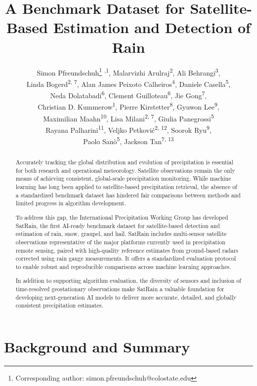 \documentclass[11pt]{article}
\title{A Benchmark Dataset for Satellite-Based Estimation and Detection of Rain}
\author{%
	  Simon Pfreundschuh\thanks{Corresponding author: simon.pfreundschuh@colostate.edu} \textsuperscript{,1}, %
	Malarvizhi Arulraj\textsuperscript{2}, %
	Ali Behrangi\textsuperscript{3},\\ %
	Linda Bogerd\textsuperscript{2, 7},%
	Alan James Peixoto Calheiros\textsuperscript{4}, %
	Daniele Casella\textsuperscript{5},\\ %
	Neda Dolatabadi\textsuperscript{6}, %
	Clement Guilloteau\textsuperscript{6}, %
	Jie Gong\textsuperscript{7},\\ %
	Christian D. Kummerow\textsuperscript{1}, %
	Pierre Kirstetter\textsuperscript{8},  %
	Gyuwon Lee\textsuperscript{9},\\ %
	Maximilian Maahn\textsuperscript{10}, %
	Lisa Milani\textsuperscript{2, 7}, %
  Giulia Panegrossi\textsuperscript{5} \\ %
	Rayana Palharini\textsuperscript{11},%
	Veljko Petković\textsuperscript{2, 12}, %
	Soorok Ryu\textsuperscript{9},\\ %
	Paolo Sanò\textsuperscript{5}, %
	Jackson Tan\textsuperscript{7, 13}
}
\date{
  \begin{flushleft}
	\footnotesize
	\textsuperscript{1} Department of Atmospheric Science, Colorado State University \\
	\textsuperscript{2} Earth System Science Interdisciplinary Center, University of Maryland  \\
	\textsuperscript{3} Department of Hydrology and Atmospheric Sciences, University of Arizona\\
	\textsuperscript{4} Instituto Nacional de Pesquisas Espaciais \\
	\textsuperscript{5} Institute of Atmospheric Sciences and Climate, Italian National Research Council \\
	\textsuperscript{6} Department of Civil and Environmental Engineering, University of California Irvine \\
	\textsuperscript{7} NASA Goddard Space Flight Center \\
  \textsuperscript{8} School of Meteorology \& School of Civil Engineering and Environmental Science, University of Oklahoma \\
	\textsuperscript{9} Department of Atmospheric Sciences, Kyungpook National University \\
	\textsuperscript{10} Institute for Meteorology, Leipzig University \\
  \textsuperscript{11} Departamento de Prevención de Riegos y Medio Ambiente, Universidad Tecnológica Metropolitana, \\
	\textsuperscript{12} Cooperative Institute for Satellite Earth System Studies, University of Maryland  \\
  \textsuperscript{13} University of Maryland, Baltimore County \\
	\end{flushleft}
}
\begin{document}
\maketitle


\begin{abstract}

	Accurately tracking the global distribution and evolution of precipitation is essential for both research and operational meteorology. Satellite observations remain the only means of achieving consistent, global-scale precipitation monitoring. While machine learning has long been applied to satellite-based precipitation retrieval, the absence of a standardized benchmark dataset has hindered fair comparisons between methods and limited progress in algorithm development.

	To address this gap, the International Precipitation Working Group has developed SatRain, the first AI-ready benchmark dataset for satellite-based detection and estimation of rain, snow, graupel, and hail. SatRain includes multi-sensor satellite observations representative of the major platforms currently used in precipitation remote sensing, paired with high-quality reference estimates from ground-based radars corrected using rain gauge measurements. It offers a standardized evaluation protocol to enable robust and reproducible comparisons across machine learning approaches.

	In addition to supporting algorithm evaluation, the diversity of sensors and inclusion of time-resolved geostationary observations make SatRain a valuable foundation for developing next-generation AI models to deliver more accurate, detailed, and globally consistent precipitation estimates.
\end{abstract}

\section{Background and Summary}
\end{document}
